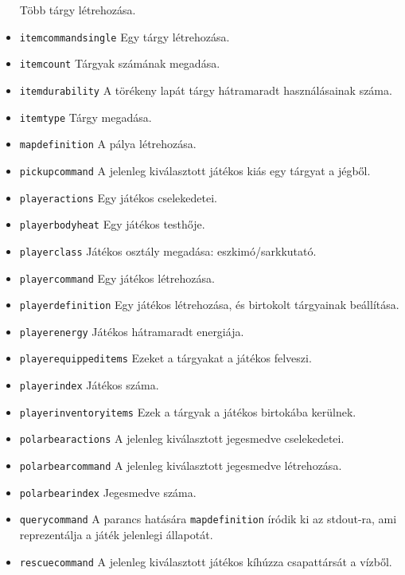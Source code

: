 \begin{itemize}
Több tárgy létrehozása.
\item \texttt{item\textunderscore{}command\textunderscore{}single}
Egy tárgy létrehozása.
\item \texttt{item\textunderscore{}count}
Tárgyak számának megadása.
\item \texttt{item\textunderscore{}durability}
A törékeny lapát tárgy hátramaradt használásainak száma.
\item \texttt{item\textunderscore{}type}
Tárgy megadása.
\item \texttt{map\textunderscore{}definition}
A pálya létrehozása.
\item \texttt{pickup\textunderscore{}command}
A jelenleg kiválasztott játékos kiás egy tárgyat a jégből.
\item \texttt{player\textunderscore{}actions}
Egy játékos cselekedetei.
\item \texttt{player\textunderscore{}bodyheat}
Egy játékos testhője.
\item \texttt{player\textunderscore{}class}
Játékos osztály megadása: eszkimó/sarkkutató.
\item \texttt{player\textunderscore{}command}
Egy játékos létrehozása.
\item \texttt{player\textunderscore{}definition}
Egy játékos létrehozása, és birtokolt tárgyainak beállítása.
\item \texttt{player\textunderscore{}energy}
Játékos hátramaradt energiája.
\item \texttt{player\textunderscore{}equipped\textunderscore{}items}
Ezeket a tárgyakat a játékos felveszi.
\item \texttt{player\textunderscore{}index}
Játékos száma.
\item \texttt{player\textunderscore{}inventory\textunderscore{}items}
Ezek a tárgyak a játékos birtokába kerülnek.
\item \texttt{polarbear\textunderscore{}actions}
A jelenleg kiválasztott jegesmedve cselekedetei.
\item \texttt{polarbear\textunderscore{}command}
A jelenleg kiválasztott jegesmedve létrehozása.
\item \texttt{polarbear\textunderscore{}index}
Jegesmedve száma.
\item \texttt{query\textunderscore{}command}
A parancs hatására \texttt{map\textunderscore{}definition} íródik ki az stdout-ra, ami reprezentálja a játék jelenlegi állapotát.
\item \texttt{rescue\textunderscore{}command}
A jelenleg kiválasztott játékos kíhúzza csapattársát a vízből.

\end{itemize}
